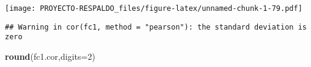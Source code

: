 \documentclass[
]{article}
\newenvironment{Shaded}{\begin{snugshade}}{\end{snugshade}}
\newcommand{\CommentTok}[1]{\textcolor[rgb]{0.56,0.35,0.01}{\textit{#1}}}
\newcommand{\DataTypeTok}[1]{\textcolor[rgb]{0.13,0.29,0.53}{#1}}
\newcommand{\DecValTok}[1]{\textcolor[rgb]{0.00,0.00,0.81}{#1}}
\newcommand{\KeywordTok}[1]{\textcolor[rgb]{0.13,0.29,0.53}{\textbf{#1}}}
\newcommand{\NormalTok}[1]{#1}
\newcommand{\StringTok}[1]{\textcolor[rgb]{0.31,0.60,0.02}{#1}}
\begin{document}
\texttt{[image: PROYECTO-RESPALDO\_files/figure-latex/unnamed-chunk-1-79.pdf]}

\begin{Shaded}
\end{Shaded}

\begin{verbatim}
## Warning in cor(fc1, method = "pearson"): the standard deviation is zero
\end{verbatim}

\begin{Shaded}
\begin{Highlighting}[]
\KeywordTok{round}\NormalTok{(fc1.cor,}\DataTypeTok{digits=}\DecValTok{2}\NormalTok{)}
\end{Highlighting}
\end{Shaded}
\end{document}
